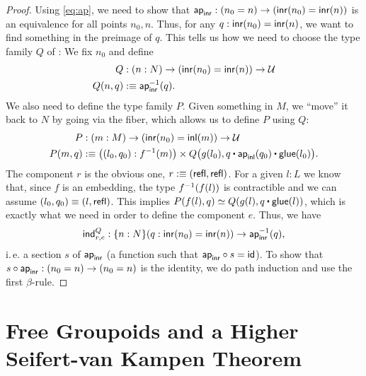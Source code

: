 \begin{proof}
 Using \eqref{eq:ap}, we need to show that $\mathsf{ap}_{\mathsf{inr}} : (n_0 = n) \to (\mathsf{inr}(n_0) = \mathsf{inr}(n))$
 is an equivalence for all points $n_0, n$.
 Thus, for any $q : \mathsf{inr}(n_0) = \mathsf{inr}(n)$, we want to find something in the preimage of $q$.
 This tells us how we need to choose the type family $Q$ of :
 We fix $n_0$ and define
 \begin{align*}
  Q &: (n : N) \to (\mathsf{inr}(n_0) = \mathsf{inr}(n)) \to \mathcal{U} \\ 
  Q(n,q) &:\equiv \mathsf{ap}_{\mathsf{inr}}^{-1}(q).
 \end{align*}
 We also need to define the type family $P$.
 Given something in $M$, we ``move'' it back to $N$ by going via the fiber, which
 allows us to define $P$ using $Q$:
 \begin{align*}
  P &: (m : M) \to (\inr(n_0) = \inl(m)) \to \UU \\
  P(m,q) &:\equiv \left((l_0, q_0) : f^{-1}(m)\right) \times
      Q\big(g(l_0), q \ct \ap_{\inl}(q_0) \ct \glue(l_0)\big).
 \end{align*}
 The component $r$ is the obvious one,
 $r :\equiv (\mathsf{refl}, \mathsf{refl})$.
 For a given $l:L$ we know that, since $f$ is an embedding, the type $f^{-1}(f(l))$
 is contractible and we can assume $(l_0, q_0) \equiv (l, \mathsf{refl})$.
 This implies $P(f(l),q) \simeq Q(g(l),q \ct \glue(l))$, which is exactly what we
 need in order to define the component $e$.
 Thus, we have 
 \begin{equation*}
  \mathsf{ind}^Q_{r,e} : \{n : N\}(q : \mathsf{inr}(n_0) = \mathsf{inr}(n)) \to \mathsf{ap}_{\mathsf{inr}}^{-1}(q),
 \end{equation*}
 i.\,e. a section $s$ of $\mathsf{ap}_{\mathsf{inr}}$ (a function such that $\mathsf{ap}_{\mathsf{inr}} \circ s = \mathsf{id}$).
 To show that $s \circ \mathsf{ap}_{\mathsf{inr}} : (n_0 = n) \to (n_0 = n)$ is the identity,
 we do path induction and use the first $\beta$-rule.
\end{proof}

\section{Free Groupoids and a Higher Seifert-van Kampen Theorem}\label{sec:paths-svk}

